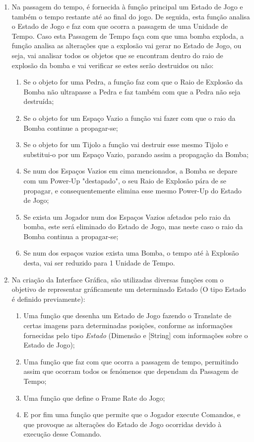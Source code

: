\documentclass[a4paper]{article}
\begin{document}
\begin{enumerate}
 \item Na passagem do tempo, é fornecida à funçâo principal um Estado de Jogo e também o tempo restante até ao final do jogo. De seguida, esta função analisa o Estado de Jogo e faz com que ocorra a passagem de uma Unidade de Tempo. Caso esta Passagem de Tempo faça com que uma bomba exploda, a função analisa as alterações que a explosão vai gerar no Estado de Jogo, ou seja, vai analisar todos os objetos que se encontram dentro do raio de explosão da bomba e vai verificar se estes serão destruidos ou não:
 \begin{enumerate}
 \item Se o objeto for uma Pedra, a função faz com que o Raio de Explosão da Bomba não ultrapasse a Pedra e faz também com que a Pedra não seja destruída;
 \item Se o objeto for um Espaço Vazio a função vai fazer com que o raio da Bomba continue a propagar-se;
 \item Se o objeto for um Tijolo a função vai destruir esse mesmo Tijolo e substitui-o por um Espaço Vazio, parando assim a propagação da Bomba;
 \item Se num dos Espaços Vazios em cima mencionados, a Bomba se depare com um Power-Up "destapado", o seu Raio de Explosão pára de se propagar, e consequentemente elimina esse mesmo Power-Up do Estado de Jogo;
 \item Se exista um Jogador num dos Espaços Vazios afetados pelo raio da bomba, este será eliminado do Estado de Jogo, mas neste caso o raio da Bomba continua a propagar-se;
 \item Se num dos espaços vazios exista uma Bomba, o tempo até à Explosão desta, vai ser reduzido para 1 Unidade de Tempo.
\end{enumerate}
 \item Na criação da Interface Gráfica, são utilizadas diversas funções com o objetivo de representar gráficamente um determinado Estado (O tipo Estado é definido previamente):
 \begin{enumerate}
 \item Uma função que desenha um Estado de Jogo fazendo o Translate de certas imagens para determinadas posições, conforme as informações fornecidas pelo tipo \emph{Estado} (Dimensão e [String] com informações sobre o Estado de Jogo);
 \item Uma função que faz com que ocorra a passagem de tempo, permitindo assim que ocorram todos os fenómenos que dependam da Passagem de Tempo;
 \item Uma função que define o Frame Rate do Jogo;
 \item E por fim uma função que permite que o Jogador execute Comandos, e que provoque as alterações do Estado de Jogo ocorridas devido à execução desse Comando.
 \end{enumerate}


\end{enumerate}
\end{document}
